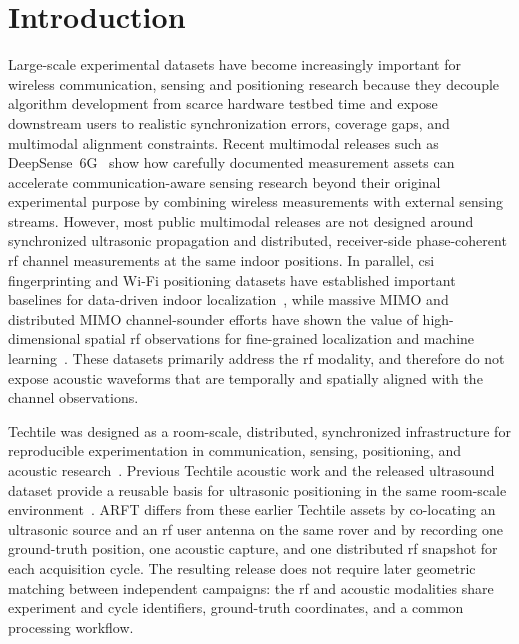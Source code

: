 \section{Introduction}
\glsresetall

Large-scale experimental datasets have become increasingly important for wireless communication, sensing and positioning research because they decouple algorithm development from scarce hardware testbed time and expose downstream users to realistic synchronization errors, coverage gaps, and multimodal alignment constraints. Recent multimodal releases such as DeepSense~6G~\cite{alkhateeb2023deepsense} show how carefully documented measurement assets can accelerate communication-aware sensing research beyond their original experimental purpose by combining wireless measurements with external sensing streams. However, most public multimodal releases are not designed around synchronized ultrasonic propagation and distributed, receiver-side phase-coherent \gls{rf} channel measurements at the same indoor positions. In parallel, \gls{csi} fingerprinting and Wi-Fi positioning datasets have established important baselines for data-driven indoor localization~\cite{kazemi2022csifingerprint,dai2023wifi,kordi2024survey}, while massive MIMO and distributed MIMO channel-sounder efforts have shown the value of high-dimensional spatial \gls{rf} observations for fine-grained localization and machine learning~\cite{li2022massivemimo,euchner2022bigcsidata}. These datasets primarily address the \gls{rf} modality, and therefore do not expose acoustic waveforms that are temporally and spatially aligned with the channel observations.

Techtile was designed as a room-scale, distributed, synchronized infrastructure for reproducible experimentation in communication, sensing, positioning, and acoustic research~\cite{techtilePrimer,techtileOpen6g,techtile-acoustic}. Previous Techtile acoustic work and the released ultrasound dataset provide a reusable basis for ultrasonic positioning in the same room-scale environment~\cite{Echoes_of_accuracy,dataset_ultrasound_techtile}. ARFT differs from these earlier Techtile assets by co-locating an ultrasonic source and an \gls{rf} user antenna on the same rover and by recording one ground-truth position, one acoustic capture, and one distributed \gls{rf} snapshot for each acquisition cycle. The resulting release does not require later geometric matching between independent campaigns: the \gls{rf} and acoustic modalities share experiment and cycle identifiers, ground-truth coordinates, and a common processing workflow.

